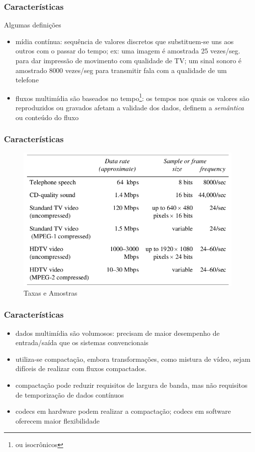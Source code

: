 \documentclass[]{beamer}
\begin{document}
\begin{frame}
  \frametitle{Características}
Algumas definições
\begin{itemize}
  \item mídia contínua: sequência de valores discretos que substituem-se uns aos outros
com o passar do tempo; ex: uma imagem é amostrada 25 vezes/seg. para 
dar impressão de movimento com qualidade de TV; um sinal sonoro é amostrado
8000 vezes/seg para transmitir fala com a qualidade de um telefone
  \item fluxos multimídia são baseados no tempo\footnote{ou isocrônicos}: os tempos nos quais
os valores são reproduzidos ou gravados afetam a validade dos dados, definem 
a \emph{semântica} ou conteúdo do fluxo
  
\end{itemize}
\end{frame}

\begin{frame}
  \frametitle{Características}
  \begin{figure}[hbtp]
   \caption{Taxas e Amostras}
   \begin{center}
    \includegraphics[scale=0.33]{taxas_e_amostras.png}
   \end{center}
  \end{figure}
\end{frame}

\begin{frame}
  \frametitle{Características}
\begin{itemize}
\item dados multimídia são volumosos: precisam de maior desempenho de entrada/saída que os
sistemas convencionais
  \item utiliza-se compactação, embora transformações, como mistura de vídeo, sejam 
difíceis de realizar com fluxos compactados.
  \item compactação pode reduzir requisitos de largura de banda, mas não requisitos de
temporização de dados contínuos
  \item codecs em hardware podem realizar a compactação; codecs em software oferecem
maior flexibilidade
\end{itemize}
\end{frame}
\end{document}
